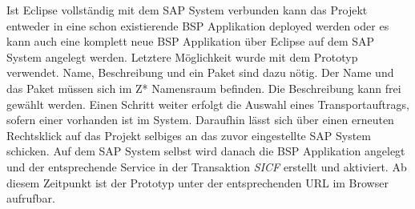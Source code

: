 Ist Eclipse vollständig mit dem SAP System verbunden kann das Projekt entweder in eine schon existierende BSP Applikation deployed werden oder es kann auch eine komplett neue BSP Applikation über Eclipse auf dem SAP System angelegt werden. Letztere Möglichkeit wurde mit dem Prototyp verwendet. Name, Beschreibung und ein Paket sind dazu nötig. Der Name und das Paket müssen sich im Z* Namensraum befinden. Die Beschreibung kann frei gewählt werden. Einen Schritt weiter erfolgt die Auswahl eines Transportauftrags, sofern einer vorhanden ist im System. Daraufhin lässt sich über einen erneuten Rechtsklick auf das Projekt selbiges an das zuvor eingestellte SAP System schicken. Auf dem SAP System selbst wird danach die BSP Applikation angelegt und der entsprechende Service in der Transaktion \textit{SICF} erstellt und aktiviert. Ab diesem Zeitpunkt ist der Prototyp unter der entsprechenden URL im Browser aufrufbar.
